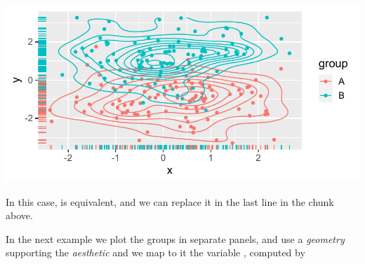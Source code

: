 \documentclass[krantz2]{krantz}\usepackage{knitr}
\begin{document}
\begin{knitrout}\footnotesize
{}\color{fgcolor}\begin{kframe}
\begin{alltt}
    \hlopt{+}
  \hlstd{()} \hlopt{+}
  \hlstd{()} \hlopt{+}
  \hlstd{()}
\end{alltt}
\end{kframe}

{\centering \includegraphics[width=.7\textwidth]{figure/pos-density-plot-10-1}

}



\end{knitrout}

In this case,  is equivalent, and we can replace it in the last line in the chunk above.

\begin{knitrout}\footnotesize
{}\color{fgcolor}\begin{kframe}
\begin{alltt}
  \hlstd{()}
\end{alltt}
\end{kframe}
\end{knitrout}

In the next example we plot the groups in separate panels, and use a \emph{geometry} supporting the  \emph{aesthetic} and we map to it the variable , computed by 
\end{document}
